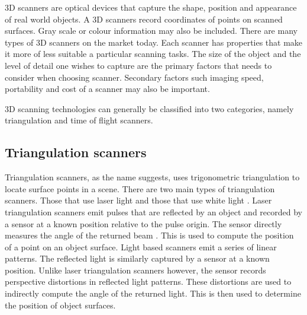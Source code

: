 3D scanners are optical devices that capture the shape, position and appearance of real world objects. A 3D scanners record coordinates of points on scanned surfaces. Gray scale or colour information may also be included. There are many types of 3D scanners on the market today. Each scanner has properties that make it more of less suitable a particular scanning tasks. The size of the object and the level of detail one wishes to capture are the primary factors that needs to consider when choosing scanner. Secondary factors such imaging speed, portability and cost of a scanner may also be important.

3D scanning technologies can generally be classified into two categories, namely triangulation and time of flight scanners.

\subsection{Triangulation scanners}

Triangulation scanners, as the name suggests, uses trigonometric triangulation \cite{Frohlich2004} to locate surface points in a scene. There are two main types of triangulation scanners. Those that use laser light and those that use white light \cite{Brown2012}. Laser triangulation scanners emit pulses that are reflected by an object and recorded by a sensor at a known position relative to the pulse origin. The sensor directly measures the angle of the returned beam . This is used to compute the position of a point on an object surface. Light based scanners emit a series of linear patterns. The reflected light is similarly captured by a sensor at a known position. Unlike laser triangulation scanners however, the sensor records perspective distortions in reflected light patterns. These distortions are used to indirectly compute the angle of the returned light. This is then used to determine the position of object surfaces.

